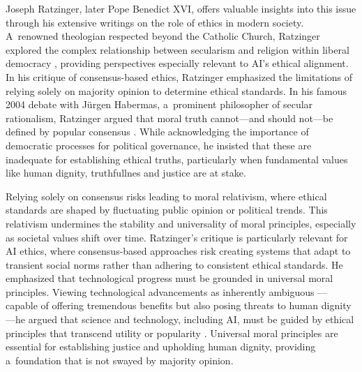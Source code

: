 \documentclass[%
  manuscript=article,
  year=2024,
  volume=77,
  doi=10.59203/zfn.77.707,
]{zfn}
\begin{document}
Joseph Ratzinger, later Pope Benedict XVI, offers valuable insights into this issue through his extensive writings on the role of ethics in modern society. A~renowned theologian respected beyond the Catholic Church, Ratzinger explored the complex relationship between secularism and religion within liberal democracy 
\parencite[][]{paskewich_liberalism_2008}, %
 providing perspectives especially relevant to AI's ethical alignment. In his critique of consensus-based ethics, Ratzinger emphasized the limitations of relying solely on majority opinion to determine ethical standards. In his famous 2004 debate with Jürgen Habermas, a~prominent philosopher of secular rationalism, Ratzinger argued that moral truth cannot---and should not---be defined by popular consensus 
\parencite[][]{ratzinger_dialectics_2006}. %
 While acknowledging the importance of democratic processes for political governance, he insisted that these are inadequate for establishing ethical truths, particularly when fundamental values like human dignity, truthfullnes and justice are at stake.



Relying solely on consensus risks leading to moral relativism, where ethical standards are shaped by fluctuating public opinion or political trends. This relativism undermines the stability and universality of moral principles, especially as societal values shift over time. Ratzinger's critique is particularly relevant for AI ethics, where consensus-based approaches risk creating systems that adapt to transient social norms rather than adhering to consistent ethical standards. He emphasized that technological progress must be grounded in universal moral principles. Viewing technological advancements as inherently ambiguous 
\parencite[][]{latkovic_thinking_2015}%
---capable of offering tremendous benefits but also posing threats to human dignity---he argued that science and technology, including AI, must be guided by ethical principles that transcend utility or popularity 
\parencite[][section 70]{benedict_xvi_caritas_2009}. %
 Universal moral principles are essential for establishing justice and upholding human dignity, providing a~foundation that is not swayed by majority opinion.
\end{document}
